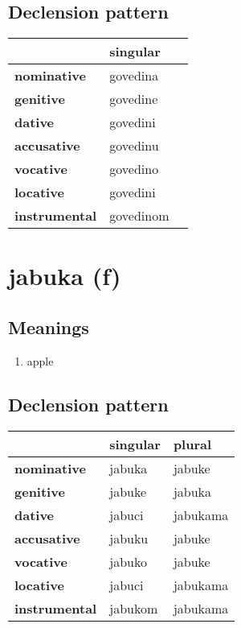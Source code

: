 \subsection*{Declension pattern}
\begin{tabularx}{\linewidth}{Xll}
\toprule
{} &   singular \\
\midrule
\textbf{nominative  } &   govedina \\
\textbf{genitive    } &   govedine \\
\textbf{dative      } &   govedini \\
\textbf{accusative  } &   govedinu \\
\textbf{vocative    } &   govedino \\
\textbf{locative    } &   govedini \\
\textbf{instrumental} &  govedinom \\
\bottomrule
\end{tabularx}

\filbreak
\section{jabuka (f)}
\subsection*{Meanings}
\begin{enumerate}
\item apple
\end{enumerate}
\subsection*{Declension pattern}
\begin{tabularx}{\linewidth}{Xll}
\toprule
{} & singular &    plural \\
\midrule
\textbf{nominative  } &   jabuka &    jabuke \\
\textbf{genitive    } &   jabuke &    jabuka \\
\textbf{dative      } &   jabuci &  jabukama \\
\textbf{accusative  } &   jabuku &    jabuke \\
\textbf{vocative    } &   jabuko &    jabuke \\
\textbf{locative    } &   jabuci &  jabukama \\
\textbf{instrumental} &  jabukom &  jabukama \\
\bottomrule
\end{tabularx}

